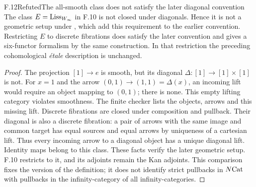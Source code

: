 \begin{claim}{F.12}{Refuted}{The all-smooth class does not satisfy the later diagonal convention}
The class $E=\mathrm{Liss}_{W_\infty}$ in F.10 is not closed under diagonals. Hence it is not a geometric setup under \citet[Definition 2.1.1 and Remark 2.1.2]{EFHeyerMann2024}, which add this requirement to the earlier convention. Restricting $E$ to discrete fibrations does satisfy the later convention and gives a six-functor formalism by the same construction. In that restriction the preceding cohomological \emph{\'{e}tale} description is unchanged.
\end{claim}
\begin{proof}
The projection $[1]\to e$ is smooth, but its diagonal $\Delta:[1]\to[1]\times[1]$ is not. For $x=1$ and the arrow $(0,1)\to(1,1)=\Delta(x)$, an incoming lift would require an object mapping to $(0,1)$; there is none. This empty lifting category violates smoothness. The finite checker lists the objects, arrows and this missing lift. Discrete fibrations are closed under composition and pullback. Their diagonal is also a discrete fibration: a pair of arrows with the same image and common target has equal sources and equal arrows by uniqueness of a cartesian lift. Thus every incoming arrow to a diagonal object has a unique diagonal lift. Identity maps belong to this class. These facts verify the later geometric setup. F.10 restricts to it, and its adjoints remain the Kan adjoints. This comparison fixes the version of the definition; it does not identify strict pullbacks in $N\mathrm{Cat}$ with pullbacks in the infinity-category of all infinity-categories.
\end{proof}

